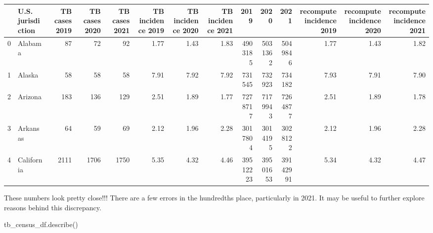 \documentclass[
  letterpaper,
  DIV=11,
  numbers=noendperiod]{scrreprt}
\newenvironment{Shaded}{\begin{snugshade}}{\end{snugshade}}
\newcommand{\NormalTok}[1]{\textcolor[rgb]{0.00,0.23,0.31}{#1}}
\begin{document}
\begin{tabular}{llrrrrrrrrrrrr}
\toprule
{} & U.S. jurisdiction &  TB cases 2019 &  TB cases 2020 &  TB cases 2021 &  TB incidence 2019 &  TB incidence 2020 &  TB incidence 2021 &      2019 &      2020 &      2021 &  recompute incidence 2019 &  recompute incidence 2020 &  recompute incidence 2021 \\
\midrule
0 &           Alabama &             87 &             72 &             92 &               1.77 &               1.43 &               1.83 &   4903185 &   5031362 &   5049846 &                      1.77 &                      1.43 &                      1.82 \\
1 &            Alaska &             58 &             58 &             58 &               7.91 &               7.92 &               7.92 &    731545 &    732923 &    734182 &                      7.93 &                      7.91 &                      7.90 \\
2 &           Arizona &            183 &            136 &            129 &               2.51 &               1.89 &               1.77 &   7278717 &   7179943 &   7264877 &                      2.51 &                      1.89 &                      1.78 \\
3 &          Arkansas &             64 &             59 &             69 &               2.12 &               1.96 &               2.28 &   3017804 &   3014195 &   3028122 &                      2.12 &                      1.96 &                      2.28 \\
4 &        California &           2111 &           1706 &           1750 &               5.35 &               4.32 &               4.46 &  39512223 &  39501653 &  39142991 &                      5.34 &                      4.32 &                      4.47 \\
\bottomrule
\end{tabular}

These numbers look pretty close!!! There are a few errors in the
hundredths place, particularly in 2021. It may be useful to further
explore reasons behind this discrepancy.

\begin{Shaded}
\begin{Highlighting}[]
\NormalTok{tb\_census\_df.describe()}
\end{Highlighting}
\end{Shaded}
\end{document}
